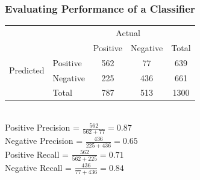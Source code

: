 \documentclass[serif,11pt,aspectratio=1610,table]{beamer}
\begin{document}
\begin{frame}
 \frametitle{Evaluating Performance of a Classifier}
\begin{tabular}{|l|l|c|c|c|}
 \cline{3-5}
 \multicolumn{2}{c|}{}& \multicolumn{2}{c}{Actual}&\\
 \cline{3-5}
 \multicolumn{2}{c|}{}&Positive&Negative&Total\\
 \cline{1-5}
 \multirow{2}{*}{Predicted}& Positive & \cellcolor{orange!25}  562 & 77 & 639\\
 \cline{2-5}
 & Negative & 225 & \cellcolor{orange!25} 436 & 661\\
 \cline{2-5}
 & Total & 787 & 513 & 1300\\
\cline{1-5}
 \end{tabular} \\
\vspace{.5cm}
\footnotesize
Positive Precision = $ \frac{562 }{ 562 + 77 } = 0.87$ \\
Negative Precision = $ \frac{436 }{ 225 + 436 } = 0.65$ \\
Positive Recall = $ \frac{562 }{ 562 + 225 } = 0.71$ \\
Negative Recall = $ \frac{436 }{ 77 + 436 } = 0.84$ 
\end{frame}
\end{document}
